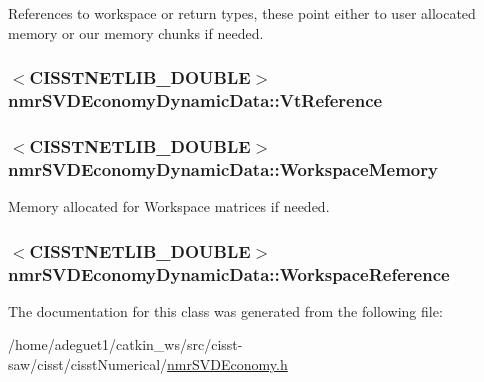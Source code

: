 References to workspace or return types, these point either to user allocated memory or our memory chunks if needed. \hypertarget{classnmr_s_v_d_economy_dynamic_data_adf2c8ef077330ba421fccf814cfffc58}{
\subsubsection[{Vt\-Reference}]{$<$C\-I\-S\-S\-T\-N\-E\-T\-L\-I\-B\-\_\-\-D\-O\-U\-B\-L\-E$>$ nmr\-S\-V\-D\-Economy\-Dynamic\-Data\-::\-Vt\-Reference\hspace{0.3cm}{\ttfamily [protected]}}}\label{classnmr_s_v_d_economy_dynamic_data_adf2c8ef077330ba421fccf814cfffc58}
\hypertarget{classnmr_s_v_d_economy_dynamic_data_a7e195abf076d992a6c1d4a29ec76be91}{
\subsubsection[{Workspace\-Memory}]{$<$C\-I\-S\-S\-T\-N\-E\-T\-L\-I\-B\-\_\-\-D\-O\-U\-B\-L\-E$>$ nmr\-S\-V\-D\-Economy\-Dynamic\-Data\-::\-Workspace\-Memory\hspace{0.3cm}{\ttfamily [protected]}}}\label{classnmr_s_v_d_economy_dynamic_data_a7e195abf076d992a6c1d4a29ec76be91}
Memory allocated for Workspace matrices if needed. \hypertarget{classnmr_s_v_d_economy_dynamic_data_a0f1d57b8c7b8756b73ae5c72e3b2037a}{
\subsubsection[{Workspace\-Reference}]{$<$C\-I\-S\-S\-T\-N\-E\-T\-L\-I\-B\-\_\-\-D\-O\-U\-B\-L\-E$>$ nmr\-S\-V\-D\-Economy\-Dynamic\-Data\-::\-Workspace\-Reference\hspace{0.3cm}{\ttfamily [protected]}}}\label{classnmr_s_v_d_economy_dynamic_data_a0f1d57b8c7b8756b73ae5c72e3b2037a}


The documentation for this class was generated from the following file\-:\begin{DoxyCompactItemize}
\item 
/home/adeguet1/catkin\-\_\-ws/src/cisst-\/saw/cisst/cisst\-Numerical/\hyperlink{nmr_s_v_d_economy_8h}{nmr\-S\-V\-D\-Economy.\-h}\end{DoxyCompactItemize}
